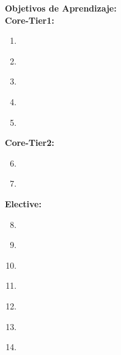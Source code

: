 \noindent \textbf{Objetivos de Aprendizaje:}\\
\noindent \textbf{Core-Tier1:}
\begin{enumerate}
	\setcounter{enumi}{0}
	\item \SESoftwareProcessesLODescribeHowInteract\xspace[\SESoftwareProcessesLODescribeHowInteractLevel]\label{sec:BOK:SESoftwareProcessesLODescribeHowInteract}
	\item \SESoftwareProcessesLODescribeTheAndSeveral\xspace[\SESoftwareProcessesLODescribeTheAndSeveralLevel]\label{sec:BOK:SESoftwareProcessesLODescribeTheAndSeveral}
	\item \SESoftwareProcessesLODescribeTheThat\xspace[\SESoftwareProcessesLODescribeTheThatLevel]\label{sec:BOK:SESoftwareProcessesLODescribeTheThat}
	\item \SESoftwareProcessesLODifferentiateAmong\xspace[\SESoftwareProcessesLODifferentiateAmongLevel]\label{sec:BOK:SESoftwareProcessesLODifferentiateAmong}
	\item \SESoftwareProcessesLODescribeHowThe\xspace[\SESoftwareProcessesLODescribeHowTheLevel]\label{sec:BOK:SESoftwareProcessesLODescribeHowThe}
\end{enumerate}
\noindent \textbf{Core-Tier2:}
\begin{enumerate}
	\setcounter{enumi}{5}
	\item \SESoftwareProcessesLOExplainTheAAndExample\xspace[\SESoftwareProcessesLOExplainTheAAndExampleLevel]\label{sec:BOK:SESoftwareProcessesLOExplainTheAAndExample}
	\item \SESoftwareProcessesLOCompareSeveral\xspace[\SESoftwareProcessesLOCompareSeveralLevel]\label{sec:BOK:SESoftwareProcessesLOCompareSeveral}
\end{enumerate}
\noindent \textbf{Elective:}
\begin{enumerate}
	\setcounter{enumi}{7}
	\item \SESoftwareProcessesLODefineSoftware\xspace[\SESoftwareProcessesLODefineSoftwareLevel]\label{sec:BOK:SESoftwareProcessesLODefineSoftware}
	\item \SESoftwareProcessesLODescribeTheFundamental\xspace[\SESoftwareProcessesLODescribeTheFundamentalLevel]\label{sec:BOK:SESoftwareProcessesLODescribeTheFundamental}
	\item \SESoftwareProcessesLOCompareSeveralModels\xspace[\SESoftwareProcessesLOCompareSeveralModelsLevel]\label{sec:BOK:SESoftwareProcessesLOCompareSeveralModels}
	\item \SESoftwareProcessesLOAssess\xspace[\SESoftwareProcessesLOAssessLevel]\label{sec:BOK:SESoftwareProcessesLOAssess}
	\item \SESoftwareProcessesLOExplainTheProcess\xspace[\SESoftwareProcessesLOExplainTheProcessLevel]\label{sec:BOK:SESoftwareProcessesLOExplainTheProcess}
	\item \SESoftwareProcessesLODescribeSeveralForControlling\xspace[\SESoftwareProcessesLODescribeSeveralForControllingLevel]\label{sec:BOK:SESoftwareProcessesLODescribeSeveralForControlling}
	\item \SESoftwareProcessesLOUseProject\xspace[\SESoftwareProcessesLOUseProjectLevel]\label{sec:BOK:SESoftwareProcessesLOUseProject}
\end{enumerate}


